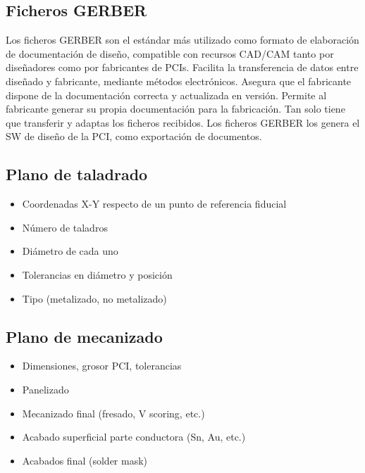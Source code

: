 \subsection{Ficheros GERBER}
Los ficheros GERBER son el estándar más utilizado como formato de elaboración de documentación de diseño, compatible con recursos CAD/CAM tanto por diseñadores como por fabricantes de PCIs. Facilita la transferencia de datos entre diseñado y fabricante, mediante métodos electrónicos. Asegura que el fabricante dispone de la documentación correcta y actualizada en versión. Permite al fabricante generar su propia documentación para la fabricación. Tan solo tiene que transferir y adaptas los ficheros recibidos. Los ficheros GERBER los genera el SW de diseño de la PCI, como exportación de documentos.

\subsection{Plano de taladrado}
\begin{itemize}
    \item Coordenadas X-Y respecto de un punto de referencia fiducial
    \item Número de taladros
    \item Diámetro de cada uno
    \item Tolerancias en diámetro y posición
    \item Tipo (metalizado, no metalizado)
\end{itemize}

\subsection{Plano de mecanizado}
\begin{itemize}
    \item Dimensiones, grosor PCI, tolerancias
    \item Panelizado
    \item Mecanizado final (fresado, V scoring, etc.)
    \item Acabado superficial parte conductora (Sn, Au, etc.)
    \item Acabados final (solder mask)
\end{itemize}

